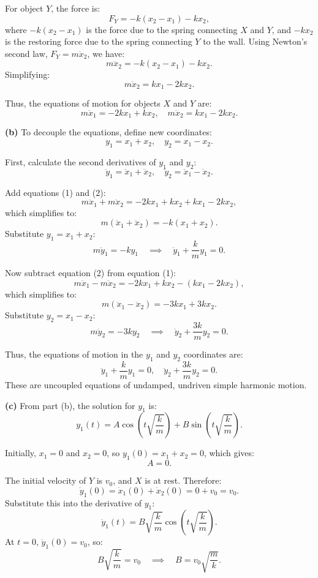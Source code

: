 For object $Y$, the force is:
\[
F_Y = -k (x_2 - x_1) - k x_2,
\]
where $-k (x_2 - x_1)$ is the force due to the spring connecting $X$ and $Y$, and $-k x_2$ is the restoring force due to the spring connecting $Y$ to the wall. Using Newton's second law, $F_Y = m \ddot{x}_2$, we have:
\[
m \ddot{x}_2 = -k (x_2 - x_1) - k x_2.
\]
Simplifying:
\[
m \ddot{x}_2 = k x_1 - 2k x_2. \tag{2}
\]

Thus, the equations of motion for objects $X$ and $Y$ are:
\[
\boxed{m \ddot{x}_1 = -2k x_1 + k x_2, \quad m \ddot{x}_2 = k x_1 - 2k x_2.}
\]

\textbf{(b)} To decouple the equations, define new coordinates:
\[
y_1 = x_1 + x_2, \quad y_2 = x_1 - x_2.
\]

First, calculate the second derivatives of $y_1$ and $y_2$:
\[
\ddot{y}_1 = \ddot{x}_1 + \ddot{x}_2, \quad \ddot{y}_2 = \ddot{x}_1 - \ddot{x}_2.
\]

Add equations (1) and (2):
\[
m \ddot{x}_1 + m \ddot{x}_2 = -2k x_1 + k x_2 + k x_1 - 2k x_2,
\]
which simplifies to:
\[
m (\ddot{x}_1 + \ddot{x}_2) = -k (x_1 + x_2).
\]
Substitute $y_1 = x_1 + x_2$:
\[
m \ddot{y}_1 = -k y_1 \quad \implies \quad \ddot{y}_1 + \frac{k}{m} y_1 = 0. \tag{3}
\]

Now subtract equation (2) from equation (1):
\[
m \ddot{x}_1 - m \ddot{x}_2 = -2k x_1 + k x_2 - (k x_1 - 2k x_2),
\]
which simplifies to:
\[
m (\ddot{x}_1 - \ddot{x}_2) = -3k x_1 + 3k x_2.
\]
Substitute $y_2 = x_1 - x_2$:
\[
m \ddot{y}_2 = -3k y_2 \quad \implies \quad \ddot{y}_2 + \frac{3k}{m} y_2 = 0. \tag{4}
\]

Thus, the equations of motion in the $y_1$ and $y_2$ coordinates are:
\[
\boxed{\ddot{y}_1 + \frac{k}{m} y_1 = 0, \quad \ddot{y}_2 + \frac{3k}{m} y_2 = 0.}
\]
These are uncoupled equations of undamped, undriven simple harmonic motion.

\textbf{(c)} From part (b), the solution for $y_1$ is:
\[
y_1(t) = A \cos\left(t \sqrt{\frac{k}{m}}\right) + B \sin\left(t \sqrt{\frac{k}{m}}\right).
\]

Initially, $x_1 = 0$ and $x_2 = 0$, so $y_1(0) = x_1 + x_2 = 0$, which gives:
\[
A = 0.
\]

The initial velocity of $Y$ is $v_0$, and $X$ is at rest. Therefore:
\[
\dot{y}_1(0) = \dot{x}_1(0) + \dot{x}_2(0) = 0 + v_0 = v_0.
\]
Substitute this into the derivative of $y_1$:
\[
\dot{y}_1(t) = B \sqrt{\frac{k}{m}} \cos\left(t \sqrt{\frac{k}{m}}\right).
\]
At $t = 0$, $\dot{y}_1(0) = v_0$, so:
\[
B \sqrt{\frac{k}{m}} = v_0 \quad \implies \quad B = v_0 \sqrt{\frac{m}{k}}.
\]

